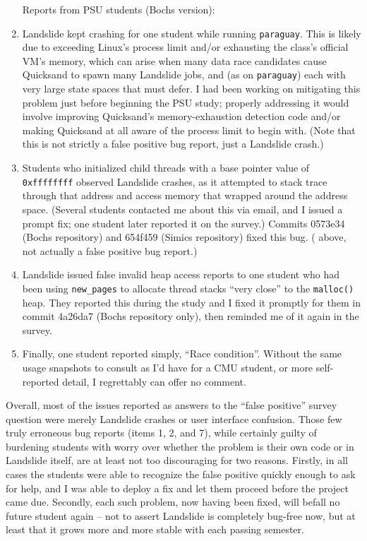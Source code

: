 \begin{enumerate}
Reports from PSU students (Bochs version):
	\item Landslide kept crashing for one student while running {\tt paraguay}.
		This is likely due to exceeding Linux's process limit and/or exhausting the class's official VM's memory,
		which can arise when many data race candidates cause Quicksand to spawn many Landslide jobs,
		and (as on {\tt paraguay}) each with very large state spaces that must defer.
		I had been working on mitigating this problem just before beginning the PSU study;
		properly addressing it would involve improving Quicksand's memory-exhaustion detection code
		and/or making Quicksand at all aware of the process limit to begin with.
		(Note that this is not strictly a false positive bug report, just a Landslide crash.)
	\item Students who initialized child threads with a base pointer value of {\tt 0xffffffff} observed Landslide crashes,
		as it attempted to stack trace through that address and access memory that wrapped around the address space.
		(Several students contacted me about this via email, and I issued a prompt fix;
		one student later reported it on the survey.)
		Commits 0573e34 (Bochs repository) and 654f459 (Simics repository) fixed this bug.
		( above, not actually a false positive bug report.)
	\item Landslide issued false invalid heap access reports to one student
		who had been using {\tt new\_pages} to allocate thread stacks ``very close'' to the {\tt malloc()} heap.
		They reported this during the study and I fixed it promptly for them in commit 4a26da7 (Bochs repository only),
		then reminded me of it again in the survey.
	\item Finally, one student reported simply, ``Race condition''.
		Without the same usage snapshots to consult as I'd have for a CMU student,
		or more self-reported detail, I regrettably can offer no comment.
\end{enumerate}

\noindent
Overall, most of the issues reported as answers to the ``false positive'' survey question
were merely Landslide crashes or user interface confusion.
Those few truly erroneous bug reports (items 1, 2, and 7),
while certainly guilty of burdening %
students with worry over whether the problem is their own code or in Landslide itself,
are at least not too discouraging for two reasons.
Firstly, in all cases the students were able to recognize the false positive quickly enough to ask for help,
and I was able to deploy a fix and let them proceed before the project came due.
Secondly, each such problem, now having been fixed, will befall no future student again --
not to assert Landslide is completely bug-free now,
but at least that it grows more and more stable with each passing semester.

